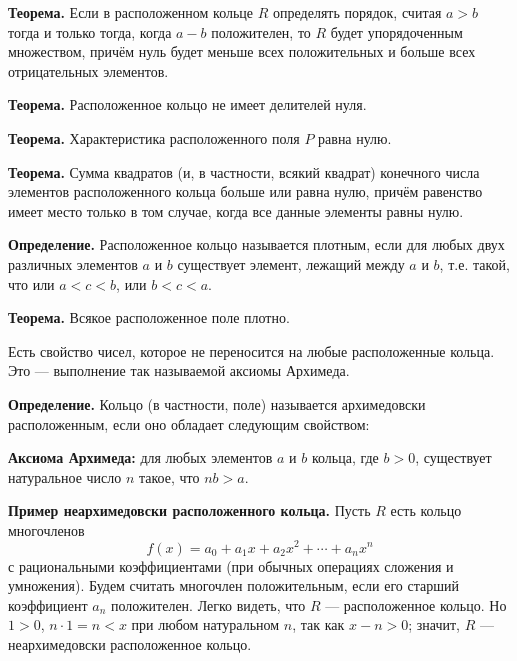 \begin{rusblock}
\textbf{Теорема.} Если в расположенном кольце $R$ определять порядок, считая $a>b$ тогда и только тогда, когда $a-b$ положителен, то $R$ будет упорядоченным множеством, причём нуль будет меньше всех положительных и больше всех отрицательных элементов.

\textbf{Теорема.} Расположенное кольцо не имеет делителей нуля.

\textbf{Теорема.} Характеристика расположенного поля $P$ равна нулю.

\textbf{Теорема.} Сумма квадратов (и, в частности, всякий квадрат) конечного числа элементов расположенного кольца больше или равна нулю, причём равенство имеет место только в том случае, когда все данные элементы равны нулю.

\textbf{Определение.} Расположенное кольцо называется плотным, если для любых двух различных элементов $a$ и $b$ существует элемент, лежащий между $a$ и $b$, т.е. такой, что или $a<c<b$, или $b<c<a$.

\textbf{Теорема.} Всякое расположенное поле плотно.
\end{rusblock}

\begin{rusblock}
Есть свойство чисел, которое не переносится на любые расположенные кольца. Это --- выполнение так называемой аксиомы Архимеда.

\textbf{Определение.} Кольцо (в частности, поле) называется архимедовски расположенным, если оно обладает следующим свойством:

\textbf{Аксиома Архимеда:} для любых элементов $a$ и $b$ кольца, где $b>0$, существует натуральное число $n$ такое, что $nb>a$.

\textbf{Пример неархимедовски расположенного кольца.} Пусть $R$ есть кольцо многочленов
\[
f(x)=a_0+a_1x+a_2x^2+\cdots+a_nx^n
\]
с рациональными коэффициентами (при обычных операциях сложения и умножения). Будем считать многочлен положительным, если его старший коэффициент $a_n$ положителен. Легко видеть, что $R$ --- расположенное кольцо. Но $1>0$, $n\cdot1=n<x$ при любом натуральном $n$, так как $x-n>0$; значит, $R$ --- неархимедовски расположенное кольцо.
\end{rusblock}

